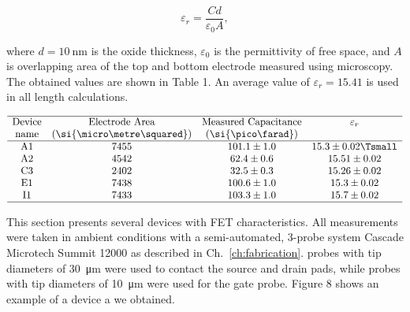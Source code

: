 \begin{equation}
    \varepsilon_r = \frac{Cd}{\varepsilon_0 A},
\end{equation}

where $d = \SI{10}{\nano\metre}$ is the oxide thickness, $\varepsilon_0$ is the permittivity of free space, and $A$ is overlapping area of the top and bottom electrode measured using microscopy. The obtained values are shown in Table 1. An average value of $\varepsilon_r = 15.41$ is used in all length calculations.

\begin{table}
    \caption{\label{tab:measured_capacitance}
        Measured values of electrode area, capacitance and $\varepsilon_r$  for several capacitors. These are consistent across various randomly selected points onto a single chip. Errors for $\varepsilon_r$ were found to be at the third decimal place.}
    \[
        \begin{array}{cccc}
            \hline\textrm{Device} & \textrm{Electrode Area}     & \textrm{Measured Capacitance} & \varepsilon_r        \\
            \textrm{name}         & (\si{\micro\metre\squared}) & (\si{\pico\farad})            &                      \\
            \hline
            \textrm{A}1           & 7455                        & 101.1\pm1.0                   & 15.3\pm0.02  \Tsmall \\
            \textrm{A}2           & 4542                        & 62.4\pm0.6                    & 15.51\pm0.02         \\
            \textrm{C}3           & 2402                        & 32.5\pm0.3                    & 15.26\pm0.02         \\
            \textrm{E}1           & 7438                        & 100.6\pm1.0                   & 15.3\pm0.02          \\
            \textrm{I}1           & 7433                        & 103.3\pm1.0                   & 15.7\pm0.02          \\
            \hline
        \end{array}
    \]
\end{table}



This section presents several devices with \gls{FET} characteristics. All measurements were taken in ambient conditions with a semi-automated, 3-probe system Cascade Microtech Summit 12000 as described in Ch.~\ref{ch:fabrication}.  probes with tip diameters of \SI{30}{\micro\metre} were used to contact the source and drain  pads, while  probes with tip diameters of \SI{10}{\micro\metre} were used for the gate probe. Figure 8 shows an example of a device a we obtained.

